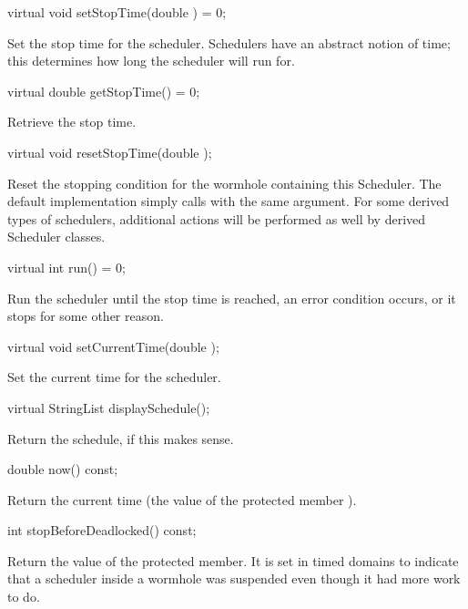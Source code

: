 \begin{example}
virtual void setStopTime(double ) = 0;
\end{example}

Set the stop time for the scheduler.  Schedulers have an abstract
notion of time; this determines how long the scheduler will run for.

\begin{example}
virtual double getStopTime() = 0;
\end{example}

Retrieve the stop time.

\begin{example}
virtual void resetStopTime(double );
\end{example}

Reset the stopping condition for the wormhole containing this Scheduler.
The default implementation simply calls  with
the same argument.  For some derived types of schedulers, additional
actions will be performed as well by derived Scheduler classes.

\begin{example}
virtual int run() = 0;
\end{example}

Run the scheduler until the stop time is reached, an error condition
occurs, or it stops for some other reason.

\begin{example}
virtual void setCurrentTime(double );
\end{example}

Set the current time for the scheduler.

\begin{example}
virtual StringList displaySchedule();
\end{example}

Return the schedule, if this makes sense.

\begin{example}
double now() const;
\end{example}

Return the current time (the value of the protected member
).

\begin{example}
int stopBeforeDeadlocked() const;
\end{example}

Return the value of the  protected member.
It is set in timed domains to indicate that a scheduler inside a
wormhole was suspended even though it had more work to do.

